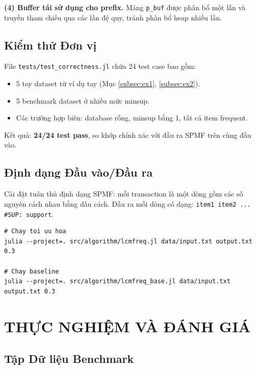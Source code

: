 \documentclass[12pt,a4paper]{article}
\theoremstyle{definition}
\begin{document}
\textbf{(4) Buffer tái sử dụng cho prefix.} Mảng \texttt{p\_buf} được phân bổ một lần và truyền tham chiếu qua các lần đệ quy, tránh phân bổ heap nhiều lần.

\subsection{Kiểm thử Đơn vị}

File \texttt{tests/test\_correctness.jl} chứa 24 test case bao gồm:
\begin{itemize}
    \item 5 toy dataset từ ví dụ tay (Mục \ref{subsec:ex1}, \ref{subsec:ex2}).
    \item 5 benchmark dataset ở nhiều mức minsup.
    \item Các trường hợp biên: database rỗng, minsup bằng 1, tất cả item frequent.
\end{itemize}
Kết quả: \textbf{24/24 test pass}, so khớp chính xác với đầu ra SPMF trên cùng đầu vào.

\subsection{Định dạng Đầu vào/Đầu ra}

Cài đặt tuân thủ định dạng SPMF: mỗi transaction là một dòng gồm các số nguyên cách nhau bằng dấu cách. Đầu ra mỗi dòng có dạng: \texttt{item1 item2 ... \#SUP: support}.

\begin{lstlisting}[caption={Sử dụng từ dòng lệnh (CLI)}, label=lst:cli]
# Chay toi uu hoa
julia --project=. src/algorithm/lcmfreq.jl data/input.txt output.txt 0.3

# Chay baseline
julia --project=. src/algorithm/lcmfreq_base.jl data/input.txt output.txt 0.3
\end{lstlisting}


\section{THỰC NGHIỆM VÀ ĐÁNH GIÁ}

\subsection{Tập Dữ liệu Benchmark}
\end{document}
